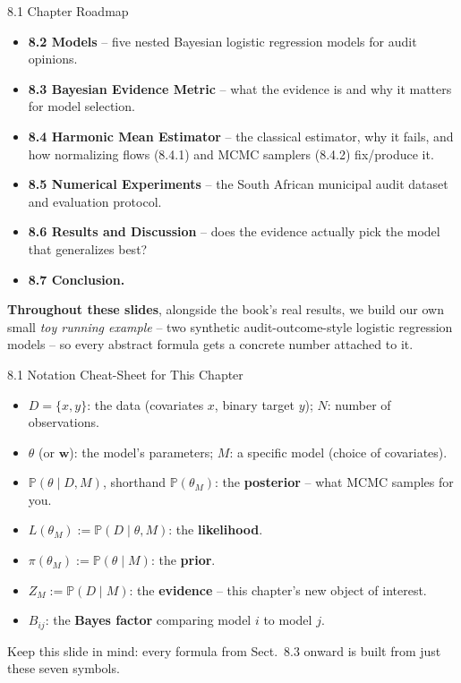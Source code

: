 \documentclass[aspectratio=169,10pt]{beamer}
\begin{document}
\begin{frame}{8.1 Chapter Roadmap}
\begin{itemize}
  \item \textbf{8.2 Models} -- five nested Bayesian logistic regression models for audit opinions.
  \item \textbf{8.3 Bayesian Evidence Metric} -- what the evidence is and why it matters for model selection.
  \item \textbf{8.4 Harmonic Mean Estimator} -- the classical estimator, why it fails, and how normalizing flows (8.4.1) and MCMC samplers (8.4.2) fix/produce it.
  \item \textbf{8.5 Numerical Experiments} -- the South African municipal audit dataset and evaluation protocol.
  \item \textbf{8.6 Results and Discussion} -- does the evidence actually pick the model that generalizes best?
  \item \textbf{8.7 Conclusion.}
\end{itemize}
\vspace{0.3cm}
\textbf{Throughout these slides}, alongside the book's real results, we build our own small \emph{toy running example} -- two synthetic audit-outcome-style logistic regression models -- so every abstract formula gets a concrete number attached to it.
\end{frame}

\begin{frame}{8.1 Notation Cheat-Sheet for This Chapter}
\begin{itemize}
  \item $D = \{x,y\}$: the data (covariates $x$, binary target $y$); $N$: number of observations.
  \item $\theta$ (or $\mathbf{w}$): the model's parameters; $M$: a specific model (choice of covariates).
  \item $\mathbb{P}(\theta\mid D,M)$, shorthand $\mathbb{P}(\theta_M)$: the \textbf{posterior} -- what MCMC samples for you.
  \item $L(\theta_M) := \mathbb{P}(D\mid\theta,M)$: the \textbf{likelihood}.
  \item $\pi(\theta_M) := \mathbb{P}(\theta\mid M)$: the \textbf{prior}.
  \item $Z_M := \mathbb{P}(D\mid M)$: the \textbf{evidence} -- this chapter's new object of interest.
  \item $B_{ij}$: the \textbf{Bayes factor} comparing model $i$ to model $j$.
\end{itemize}
\vspace{0.2cm}
Keep this slide in mind: every formula from Sect.\ 8.3 onward is built from just these seven symbols.
\end{frame}
\end{document}
